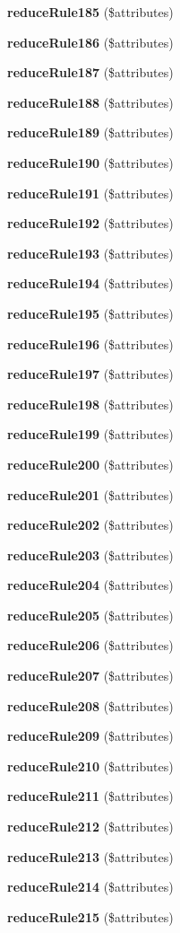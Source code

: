\begin{DoxyCompactItemize}
\item 
{\bf reduce\+Rule185} (\$attributes)
\item 
{\bf reduce\+Rule186} (\$attributes)
\item 
{\bf reduce\+Rule187} (\$attributes)
\item 
{\bf reduce\+Rule188} (\$attributes)
\item 
{\bf reduce\+Rule189} (\$attributes)
\item 
{\bf reduce\+Rule190} (\$attributes)
\item 
{\bf reduce\+Rule191} (\$attributes)
\item 
{\bf reduce\+Rule192} (\$attributes)
\item 
{\bf reduce\+Rule193} (\$attributes)
\item 
{\bf reduce\+Rule194} (\$attributes)
\item 
{\bf reduce\+Rule195} (\$attributes)
\item 
{\bf reduce\+Rule196} (\$attributes)
\item 
{\bf reduce\+Rule197} (\$attributes)
\item 
{\bf reduce\+Rule198} (\$attributes)
\item 
{\bf reduce\+Rule199} (\$attributes)
\item 
{\bf reduce\+Rule200} (\$attributes)
\item 
{\bf reduce\+Rule201} (\$attributes)
\item 
{\bf reduce\+Rule202} (\$attributes)
\item 
{\bf reduce\+Rule203} (\$attributes)
\item 
{\bf reduce\+Rule204} (\$attributes)
\item 
{\bf reduce\+Rule205} (\$attributes)
\item 
{\bf reduce\+Rule206} (\$attributes)
\item 
{\bf reduce\+Rule207} (\$attributes)
\item 
{\bf reduce\+Rule208} (\$attributes)
\item 
{\bf reduce\+Rule209} (\$attributes)
\item 
{\bf reduce\+Rule210} (\$attributes)
\item 
{\bf reduce\+Rule211} (\$attributes)
\item 
{\bf reduce\+Rule212} (\$attributes)
\item 
{\bf reduce\+Rule213} (\$attributes)
\item 
{\bf reduce\+Rule214} (\$attributes)
\item 
{\bf reduce\+Rule215} (\$attributes)

\end{DoxyCompactItemize}
